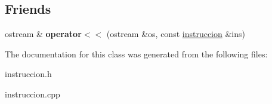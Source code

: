 \subsection*{Friends}
\begin{DoxyCompactItemize}
\item 
\hypertarget{classinstruccion_aeb5b7e55c0c959ec22a1b6e043bc1f6f}{}ostream \& {\bfseries operator$<$$<$} (ostream \&os, const \hyperlink{classinstruccion}{instruccion} \&ins)\label{classinstruccion_aeb5b7e55c0c959ec22a1b6e043bc1f6f}

\end{DoxyCompactItemize}


The documentation for this class was generated from the following files\+:\begin{DoxyCompactItemize}
\item 
instruccion.\+h\item 
instruccion.\+cpp\end{DoxyCompactItemize}
